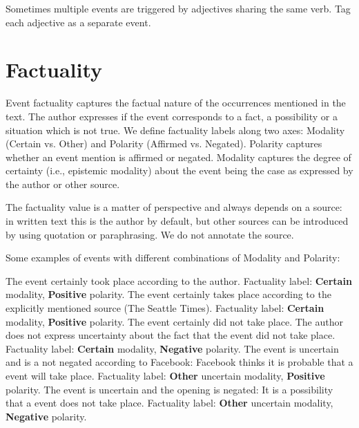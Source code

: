 Sometimes multiple events are triggered by adjectives sharing the same verb. Tag each adjective as a separate event.

\section{Factuality}

Event factuality captures the factual nature of the occurrences mentioned in the text.
The author expresses if the event corresponds to a fact, a possibility or a situation which is not true.
We define factuality labels along two axes: Modality (Certain vs. Other) and Polarity (Affirmed vs. Negated).
Polarity captures whether an event mention is affirmed or negated.
Modality captures the degree of certainty (i.e., epistemic modality) about the event being the case as expressed by the author or other source.

The factuality value is a matter of perspective and always depends on a source: in written text this is the author by default, but other sources can be introduced by using quotation or paraphrasing.
We do not annotate the source.

Some examples of events with different combinations of Modality and Polarity:
\begin{exe}
    \ex {}
        \expl The  event certainly took place according to the author.
        \expl Factuality label: \textbf{Certain} modality, \textbf{Positive} polarity.
    \ex {}
        \expl The  event certainly takes place according to the explicitly mentioned source (The Seattle Times).
        \expl Factuality label: \textbf{Certain} modality, \textbf{Positive} polarity.
    \ex {}
        \expl The  event certainly did not take place. The author does not express uncertainty about the fact that the event did not take place.
        \expl Factuality label: \textbf{Certain} modality, \textbf{Negative} polarity.
    \ex {}
        \expl The  event is uncertain and is a not negated according to Facebook: Facebook thinks it is probable that a  event will take place.
        \expl Factuality label: \textbf{Other} uncertain modality, \textbf{Positive} polarity.
    \ex {}
        \expl The  event is uncertain and the opening is negated: It is a possibility that a  event does not take place.
        \expl Factuality label: \textbf{Other} uncertain modality, \textbf{Negative} polarity.
\end{exe}

